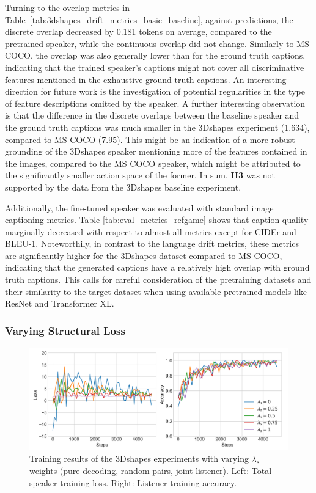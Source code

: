 Turning to the overlap metrics in Table~\ref{tab:3dshapes_drift_metrics_basic_baseline}, against predictions, the discrete overlap decreased by 0.181 tokens on average, compared to the pretrained speaker, while the continuous overlap did not change. Similarly to MS COCO, the overlap was also generally lower than for the ground truth captions, indicating that the trained speaker's captions might not cover all discriminative features mentioned in the exhaustive ground truth captions. An interesting direction for future work is the investigation of potential regularities in the type of feature descriptions omitted by the speaker. A further interesting observation is that the difference in the discrete overlaps between the baseline speaker and the ground truth captions was much smaller in the 3Dshapes experiment (1.634), compared to MS COCO (7.95). This might be an indication of a more robust grounding of the 3Dshapes speaker mentioning more of the features contained in the images, compared to the MS COCO speaker, which might be attributed to the significantly smaller action space of the former. In sum, \textbf{H3} was not supported by the data from the 3Dshapes baseline experiment.

Additionally, the fine-tuned speaker was evaluated with standard image captioning metrics. Table \ref{tab:eval_metrics_refgame} shows that caption quality marginally decreased with respect to almost all metrics except for CIDEr and BLEU-1. Noteworthily, in contrast to the language drift metrics, these metrics are significantly higher for the 3Dshapes dataset compared to MS COCO, indicating that the generated captions have a relatively high overlap with ground truth captions. This calls for careful consideration of the pretraining datasets and their similarity to the target dataset when using available pretrained models like ResNet and Transformer XL.

\subsubsection{Varying Structural Loss}

\begin{figure}[h]
	\centering
	\includegraphics[width=\linewidth]{images/shapes_refgame_49_pure_losses_all_Ls_random.png}
	\caption{Training results of the 3Dshapes experiments with varying $\lambda_s$ weights (pure decoding, random pairs, joint listener). Left: Total speaker training loss. Right: Listener training accuracy.}
	\label{fig:3dshapes_baseline_speaker_loss_listener_acc_all}
\end{figure}

